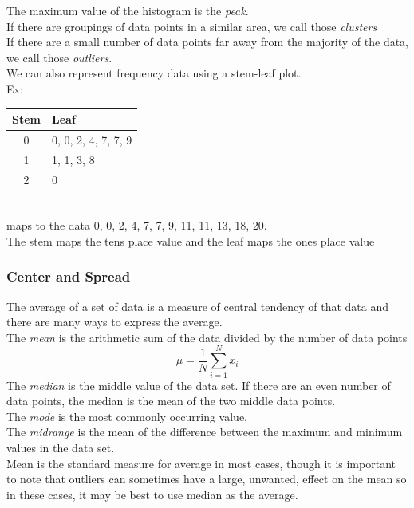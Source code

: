 The maximum value of the histogram is the \textit{peak}.\\
If there are groupings of data points in a similar area, we call those \textit{clusters}\\
If there are a small number of data points far away from the majority of the data, we call those \textit{outliers}.\\
We can also represent frequency data using a stem-leaf plot.\\
Ex:\\
\begin{tabular}{c|l}
    Stem & Leaf\\
    \hline
    0 & 0, 0, 2, 4, 7, 7, 9\\
    1 & 1, 1, 3, 8\\
    2 & 0
\end{tabular}\\
maps to the data 0, 0, 2, 4, 7, 7, 9, 11, 11, 13, 18, 20.\\
The stem maps the tens place value and the leaf maps the ones place value

\subsubsection{Center and Spread}
The average of a set of data is a measure of central tendency of that data and there are many ways to express the average.\\
The \textit{mean} is the arithmetic sum of the data divided by the number of data points
$$\mu=\frac{1}{N}\sum_{i=1}^N x_i$$
The \textit{median} is the middle value of the data set. If there are an even number of data points, the median is the mean of the two middle data points.\\
The \textit{mode} is the most commonly occurring value.\\
The \textit{midrange} is the mean of the difference between the maximum and minimum values in the data set.\\

Mean is the standard measure for average in most cases, though it is important to note that outliers can sometimes have a large, unwanted, effect on the mean so in these cases, it may be best to use median as the average.\\

